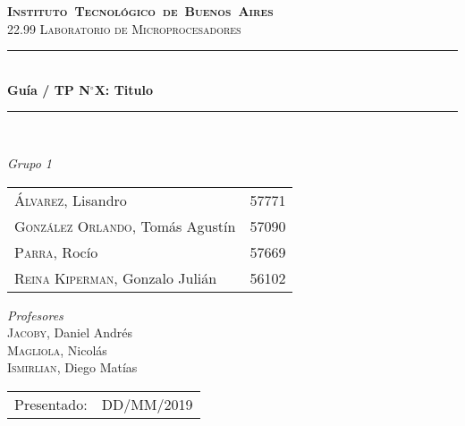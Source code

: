 \begin{titlepage}

\def\titulo{Gu\'ia / TP N$^\circ$X: Titulo}
\def\fecha-entrega{DD/MM/2019}



\newcommand{\HRule}{\rule{\linewidth}{0.5mm}}
\center
\mbox{\textsc{\LARGE \bfseries {Instituto Tecnol\'ogico de Buenos Aires}}}\\[1.5cm]
\textsc{\Large 22.99 Laboratorio de Microprocesadores}\\[0.5cm]


\HRule \\[0.6cm]
{ \Huge \bfseries \titulo }\\[0.4cm] %
\HRule \\[1.5cm]


{\large

\emph{Grupo 1}\\
\vspace{3px}

\begin{tabular}{lr} 	
\textsc{\'Alvarez}, Lisandro  & 57771 \\
\textsc{Gonz\'alez Orlando}, Tom\'as Agust\'in  & 57090 \\
\textsc{Parra}, Roc\'io  & 57669 \\
\textsc{Reina Kiperman}, Gonzalo Juli\'an  & 56102 \\
\end{tabular}

\vspace{30px}

\emph{Profesores}\\
\vspace{3px}
\textsc{Jacoby}, Daniel Andr\'es\\ 	
\textsc{Magliola}, Nicol\'as\\ 	
\textsc{Ismirlian}, Diego Mat\'ias\\ 	

\vspace{120px}

\begin{tabular}{ll}

Presentado: & \fecha-entrega\\

\end{tabular}

}

\vfill

\end{titlepage}